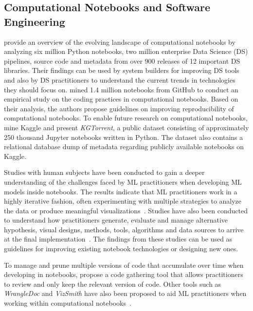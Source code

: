\documentclass[smallextended]{svjour3}       %
\begin{document}
\subsection{Computational Notebooks and Software Engineering}\label{sec:notebooks}

\citet{psallidas2019data} provide an overview of the evolving landscape of computational notebooks by analyzing six million Python notebooks, two million enterprise Data Science (DS) pipelines, source code and metadata from over 900 releases of 12 important DS libraries. Their findings can be used by system builders for improving DS tools and also by DS practitioners to understand the current trends in technologies they should focus on. \citet{pimentel2019large-scale} mined 1.4 million notebooks from GitHub to conduct an empirical study on the coding practices in computational notebooks. Based on their analysis, the authors propose guidelines on improving reproducibility of computational notebooks. To enable future research on computational notebooks, \citet{quaranta2021kgtorrent} mine Kaggle and present \textit{KGTorrent}, a public dataset consisting of approximately 250 thousand Jupyter notebooks written in Python. The dataset also contains a relational database dump of metadata regarding publicly available notebooks on Kaggle.

Studies with human subjects have been conducted to gain a deeper understanding of the challenges faced by ML practitioners when developing ML models inside notebooks. The results indicate that ML practitioners work in a highly iterative fashion, often experimenting with multiple strategies to analyze the data or produce meaningful visualizations~\citep{kandel2012enterprise,kery2018story,liu2019understanding,chattopadhyay2020whats}. Studies have also been conducted to understand how practitioners generate, evaluate and manage alternative hypothesis, visual designs, methods, tools, algorithms and data sources to arrive at the final implementation~\citep{liu2019understanding,kandel2012enterprise}. The findings from these studies can be used as guidelines for improving existing notebook technologies or designing new ones.

To manage and prune multiple versions of code that accumulate over time when developing in notebooks, \citet{head2019managing} propose a code gathering tool that allows practitioners to review and only keep the relevant version of code. Other tools such as \textit{WrangleDoc} and \textit{VizSmith} have also been proposed to aid ML practitioners when working within computational notebooks~\citep{yang2021subtle,bavishi2021vizsmith}.
\end{document}
